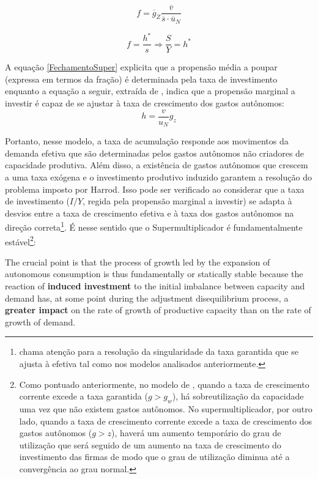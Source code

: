 $$
    f = \overline g_Z\frac{\overline v}{\overline s\cdot \overline u_N}
$$

\begin{equation}
    \label{FechamentoSuper}
	f = \frac{h^*}{s} \Rightarrow \frac{S}{Y} = h^*
\end{equation}

A equação \ref{FechamentoSuper} explicita que a propensão média a poupar (expressa em termos da fração) é determinada pela taxa de investimento enquanto a equação a seguir, extraída de \textcite{serrano_sraffian_2017}, indica que a propensão marginal a investir é capaz de se ajustar à taxa de crescimento dos gastos autônomos:
$$
h = \frac{v}{u_N}g_z
$$

Portanto, nesse modelo, a taxa de acumulação responde aos movimentos da demanda efetiva que são determinadas pelos gastos autônomos não criadores de capacidade produtiva. Além disso, a existência de gastos autônomos que crescem a uma taxa exógena e o investimento produtivo induzido garantem a resolução do problema imposto por Harrod. Isso pode ser verificado ao considerar que a taxa de investimento ($I/Y$, regida pela propensão marginal a investir) se adapta à desvios entre a taxa de crescimento efetiva e à taxa dos gastos autônomos na direção correta\footnote{\textcite{cesaratto_neo-kaleckian_2015} chama atenção para a resolução da singularidade da taxa garantida que se ajusta à efetiva tal como nos modelos analisados anteriormente.}. 
É nesse sentido que o Supermultiplicador é fundamentalmente estável\footnote{
Como pontuado anteriormente, no modelo de \textcite{harrod_essay_1939}, quando a taxa de crescimento corrente excede a taxa garantida ($g > g_w$), há sobreutilização da capacidade uma vez que não existem gastos autônomos. No supermultiplicador, por outro lado, quando a taxa de crescimento corrente excede a taxa de crescimento dos gastos autônomos ($g > z$), haverá  um aumento temporário do grau de utilização que será seguido de um aumento na taxa de crescimento do investimento das firmas de modo que o grau de utilização diminua até a convergência ao grau normal.}:

\begin{citacao}
The crucial point is that the process of growth led by the expansion of autonomous consumption is thus fundamentally or statically stable because the reaction of \textbf{induced investment} to the initial imbalance between capacity and demand has, at some point during the adjustment disequilibrium process, a \textbf{greater impact} on the rate of growth of productive capacity than on the rate of growth of demand. \cite[p.~19, grifos adicionados]{serrano_trouble_2017}
\end{citacao}


